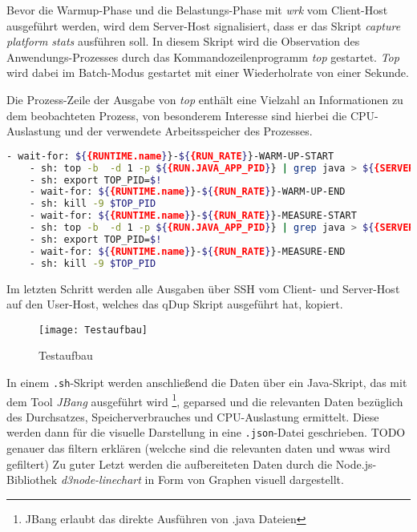 Bevor die Warmup-Phase und die Belastungs-Phase mit \textit{wrk} vom Client-Host ausgeführt werden, wird dem Server-Host signalisiert, dass
er das Skript \textit{capture platform stats} ausführen soll.
In diesem Skript wird die Observation des Anwendungs-Prozesses durch das Kommandozeilenprogramm \textit{top} gestartet.
\textit{Top} wird dabei im Batch-Modus gestartet mit einer Wiederholrate von einer Sekunde.

Die Prozess-Zeile der Ausgabe von \textit{top} enthält eine Vielzahl an Informationen zu dem beobachteten Prozess, von besonderem
Interesse sind hierbei die CPU-Auslastung und der verwendete Arbeitsspeicher des Prozesses.

\begin{lstlisting}[language=sh, caption=Auszug des qDup Skripts capture-platform-stats, captionpos=b]
    - wait-for: ${{RUNTIME.name}}-${{RUN_RATE}}-WARM-UP-START
    - sh: top -b  -d 1 -p ${{RUN.JAVA_APP_PID}} | grep java > ${{SERVER_FILE_PATH}}/output/${{RUNTIME.name}}-${{RUN_RATE}}-WARM-UP-top.out &
    - sh: export TOP_PID=$!
    - wait-for: ${{RUNTIME.name}}-${{RUN_RATE}}-WARM-UP-END
    - sh: kill -9 $TOP_PID
    - wait-for: ${{RUNTIME.name}}-${{RUN_RATE}}-MEASURE-START
    - sh: top -b  -d 1 -p ${{RUN.JAVA_APP_PID}} | grep java > ${{SERVER_FILE_PATH}}/output/${{RUNTIME.name}}-${{RUN_RATE}}-MEASURE-top.out &
    - sh: export TOP_PID=$!
    - wait-for: ${{RUNTIME.name}}-${{RUN_RATE}}-MEASURE-END
    - sh: kill -9 $TOP_PID
  \end{lstlisting}

Im letzten Schritt werden alle Ausgaben über SSH vom Client- und Server-Host auf den User-Host, welches das qDup Skript ausgeführt hat, kopiert.

\begin{figure}[ht]
	\centering
	\texttt{[image: Testaufbau]}
	\caption{Testaufbau}
\end{figure}

In einem \verb|.sh|-Skript werden anschließend die Daten über ein Java-Skript, das mit dem Tool \textit{JBang} ausgeführt
wird \footnote{JBang erlaubt das direkte Ausführen von .java Dateien},
geparsed und die relevanten Daten bezüglich des Durchsatzes, Speicherverbrauches und CPU-Auslastung ermittelt.
Diese werden dann für die visuelle Darstellung in eine \verb|.json|-Datei geschrieben.
TODO genauer das filtern erklären (welcche sind die relevanten daten und wwas wird gefiltert)
Zu guter Letzt werden die aufbereiteten Daten durch die Node.js-Bibliothek \textit{d3node-linechart} in Form von Graphen visuell dargestellt.

